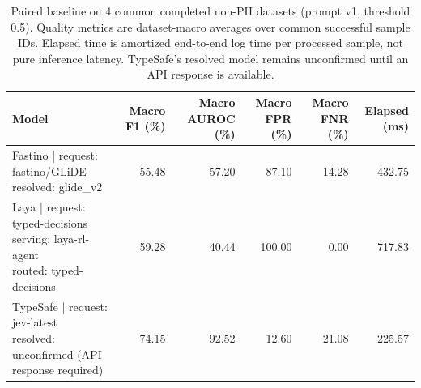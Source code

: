 \begin{table}[t]
\centering
\small
\begin{tabular}{lrrrrr}
\toprule
Model & Macro F1 (\%) & Macro AUROC (\%) & Macro FPR (\%) & Macro FNR (\%) & Elapsed (ms) \\
\midrule
\shortstack[l]{Fastino | request: fastino/GLiDE\\resolved: glide\_v2} & 55.48 & 57.20 & 87.10 & 14.28 & 432.75 \\
\shortstack[l]{Laya | request: typed-decisions\\serving: laya-rl-agent\\routed: typed-decisions} & 59.28 & 40.44 & 100.00 & 0.00 & 717.83 \\
\shortstack[l]{TypeSafe | request: jev-latest\\resolved: unconfirmed (API response required)} & 74.15 & 92.52 & 12.60 & 21.08 & 225.57 \\
\bottomrule
\end{tabular}
\caption{Paired baseline on 4 common completed non-PII datasets (prompt v1, threshold 0.5). Quality metrics are dataset-macro averages over common successful sample IDs. Elapsed time is amortized end-to-end log time per processed sample, not pure inference latency. TypeSafe's resolved model remains unconfirmed until an API response is available.}
\label{tab:model-comparison}
\end{table}
